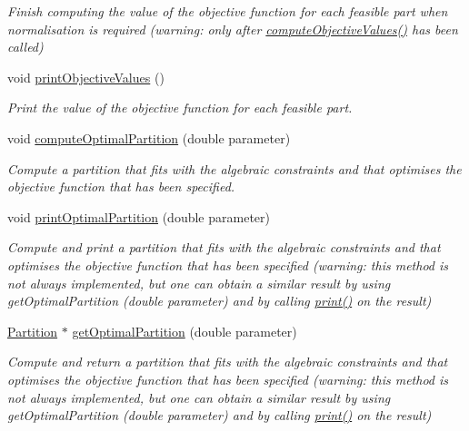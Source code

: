 \begin{DoxyCompactItemize}
\begin{DoxyCompactList}\small\item\em Finish computing the value of the objective function for each feasible part when normalisation is required (warning\-: only after \hyperlink{classNonconstrainedSet_a54d78c6dda39fd6d98c6f151b7350a02}{compute\-Objective\-Values()} has been called) \end{DoxyCompactList}\item 
\hypertarget{classNonconstrainedSet_a9cc495ca7b303fd1b24bc7cadcc9bfc4}{void \hyperlink{classNonconstrainedSet_a9cc495ca7b303fd1b24bc7cadcc9bfc4}{print\-Objective\-Values} ()}\label{classNonconstrainedSet_a9cc495ca7b303fd1b24bc7cadcc9bfc4}

\begin{DoxyCompactList}\small\item\em Print the value of the objective function for each feasible part. \end{DoxyCompactList}\item 
void \hyperlink{classNonconstrainedSet_aa23eb0dca07ada8a3b35b0f5ea1b24b2}{compute\-Optimal\-Partition} (double parameter)
\begin{DoxyCompactList}\small\item\em Compute a partition that fits with the algebraic constraints and that optimises the objective function that has been specified. \end{DoxyCompactList}\item 
void \hyperlink{classNonconstrainedSet_ad0e6da309ffd9c5e2e87b2c3e62c353f}{print\-Optimal\-Partition} (double parameter)
\begin{DoxyCompactList}\small\item\em Compute and print a partition that fits with the algebraic constraints and that optimises the objective function that has been specified (warning\-: this method is not always implemented, but one can obtain a similar result by using get\-Optimal\-Partition (double parameter) and by calling \hyperlink{classNonconstrainedSet_a7d08b45f9f37f5285fee36fb98aa58af}{print()} on the result) \end{DoxyCompactList}\item 
\hyperlink{classPartition}{Partition} $\ast$ \hyperlink{classNonconstrainedSet_a7d340ab2e3c6f0cb30b2375311376245}{get\-Optimal\-Partition} (double parameter)
\begin{DoxyCompactList}\small\item\em Compute and return a partition that fits with the algebraic constraints and that optimises the objective function that has been specified (warning\-: this method is not always implemented, but one can obtain a similar result by using get\-Optimal\-Partition (double parameter) and by calling \hyperlink{classNonconstrainedSet_a7d08b45f9f37f5285fee36fb98aa58af}{print()} on the result) \end{DoxyCompactList}\end{DoxyCompactItemize}
